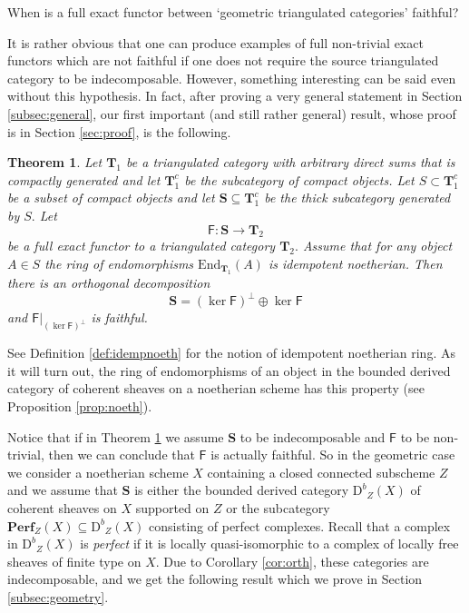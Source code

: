 \documentclass[a4paper,11pt,twoside]{amsart}
\newtheorem{thm}{Theorem}[section]
\numberwithin{equation}{section}
\theoremstyle{definition}
\begin{document}
\centerline{\sf When is a full exact functor between `geometric triangulated categories' faithful?}
\medskip

\noindent It is rather obvious that one can produce examples of full
non-trivial exact functors which are not faithful if one does not
require the source triangulated category to be
indecomposable. However, something interesting can be said even without
this hypothesis. In fact, after proving a very general statement in
Section \ref{subsec:general}, our first important (and still rather
general) result, whose proof is in Section \ref{sec:proof}, is the
following.

\begin{thm}\label{thm:gen2}
Let ${{\mathbf{{T}}}}_1$ be a triangulated category with arbitrary direct sums
that is compactly generated and let ${{\mathbf{{T}}}}_1^c$ be the subcategory of compact objects.
 Let $S\subset{{\mathbf{{T}}}}_1^c$ be a subset of compact objects and let ${{\mathbf{{S}}}}\subseteq{{\mathbf{{T}}}}_1^c$
 be the thick subcategory generated by $S.$ Let
\[
{\mathsf{{F}}}\colon{{\mathbf{{S}}}}\longrightarrow{{\mathbf{{T}}}}_2
\]
be a full exact functor to a triangulated category ${{\mathbf{{T}}}}_2.$ Assume
that for any object $A\in S$ the ring of endomorphisms
${\mathrm{End}}_{{{\mathbf{{T}}}}_1}(A)$ is idempotent noetherian. Then there is an
orthogonal decomposition
\[
{{\mathbf{{S}}}}={{(\ker{\mathsf{{F}}})}^{\perp}}{\oplus}\ker{\mathsf{{F}}}
\]
and ${\mathsf{{F}}}{|_{{{{(\ker{\mathsf{{F}}})}^{\perp}}}}}$ is faithful.
\end{thm}

See Definition \ref{def:idempnoeth} for the notion of idempotent
noetherian ring. As it will turn out, the ring of endomorphisms of an
object in the bounded derived category of coherent sheaves on a
noetherian scheme has this property (see Proposition
\ref{prop:noeth}).

Notice that if in Theorem \ref{thm:gen2} we assume ${{\mathbf{{S}}}}$ to be
indecomposable and ${\mathsf{{F}}}$ to be non-trivial, then we can conclude
that ${\mathsf{{F}}}$ is actually faithful. So in the geometric case we
consider a noetherian scheme $X$ containing a closed connected
subscheme $Z$ and we assume that ${{\mathbf{{S}}}}$ is either the bounded
derived category ${\mathrm{D}^b}_Z(X)$ of coherent sheaves on $X$ supported on
$Z$ or the subcategory ${{{\mathbf{{Perf}}}}}_Z(X)\subseteq{\mathrm{D}^b}_Z(X)$ consisting of
perfect complexes. Recall that a complex in ${\mathrm{D}^b}_Z(X)$ is
\emph{perfect} if it is locally quasi-isomorphic to a complex of
locally free sheaves of finite type on $X.$ Due to Corollary
\ref{cor:orth}, these categories are indecomposable, and we get the
following result which we prove in Section \ref{subsec:geometry}.
\end{document}
